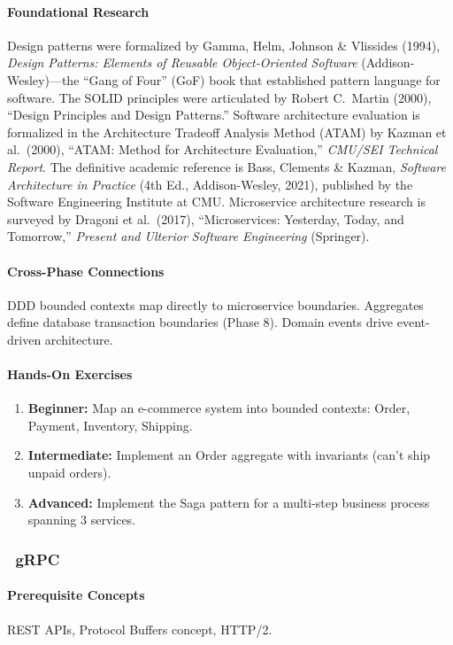 \documentclass[11pt, a4paper, oneside]{report}
\newcommand{\mustmaster}[1]{\subsubsection{\texorpdfstring{\fcolorbox{blue!40!black}{blue!8}{\footnotesize\bfseries\color{blue!40!black} MUST MASTER}~#1}{#1}}}
\begin{document}
\paragraph{Foundational Research} Design patterns were formalized by Gamma, Helm, Johnson \& Vlissides (1994), \emph{Design Patterns: Elements of Reusable Object-Oriented Software} (Addison-Wesley)---the ``Gang of Four'' (GoF) book that established pattern language for software. The SOLID principles were articulated by Robert C.\ Martin (2000), ``Design Principles and Design Patterns.'' Software architecture evaluation is formalized in the Architecture Tradeoff Analysis Method (ATAM) by Kazman et al.\ (2000), ``ATAM: Method for Architecture Evaluation,'' \emph{CMU/SEI Technical Report}. The definitive academic reference is Bass, Clements \& Kazman, \emph{Software Architecture in Practice} (4th Ed., Addison-Wesley, 2021), published by the Software Engineering Institute at CMU. Microservice architecture research is surveyed by Dragoni et al.\ (2017), ``Microservices: Yesterday, Today, and Tomorrow,'' \emph{Present and Ulterior Software Engineering} (Springer).

\paragraph{Cross-Phase Connections} DDD bounded contexts map directly to microservice boundaries. Aggregates define database transaction boundaries (Phase 8). Domain events drive event-driven architecture.

\paragraph{Hands-On Exercises}
\begin{enumerate}[leftmargin=*]
\item \textbf{Beginner:} Map an e-commerce system into bounded contexts: Order, Payment, Inventory, Shipping.
\item \textbf{Intermediate:} Implement an Order aggregate with invariants (can't ship unpaid orders).
\item \textbf{Advanced:} Implement the Saga pattern for a multi-step business process spanning 3 services.
\end{enumerate}

\mustmaster{gRPC}

\paragraph{Prerequisite Concepts} REST APIs, Protocol Buffers concept, HTTP/2.
\end{document}
